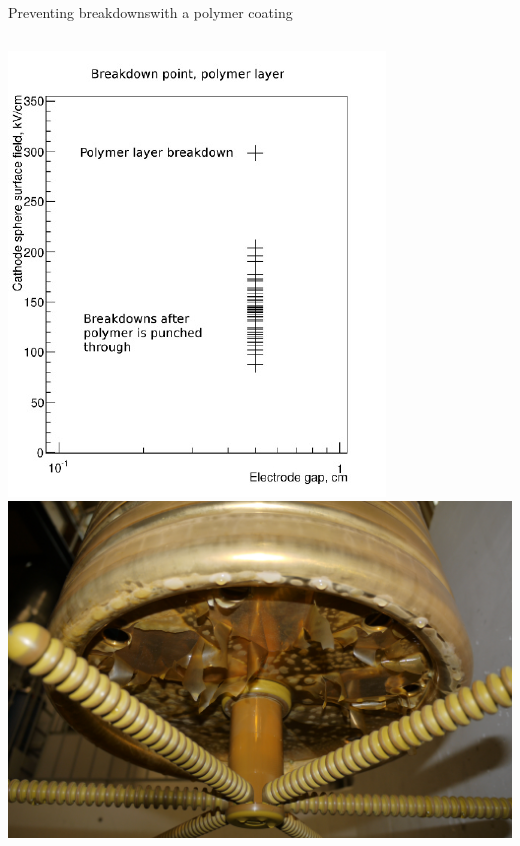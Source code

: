 \documentclass[]{beamer}
\begin{document}
\begin{frame}{Preventing breakdowns}{with a polymer coating}
\begin{columns}[c]
		\includegraphics[width=\textwidth]{defence/breakdown_latex}
		\centering
		\includegraphics[height=.95\textwidth, angle=90]{defence/AT_cathode}
	\end{columns}
\end{frame}
\end{document}
